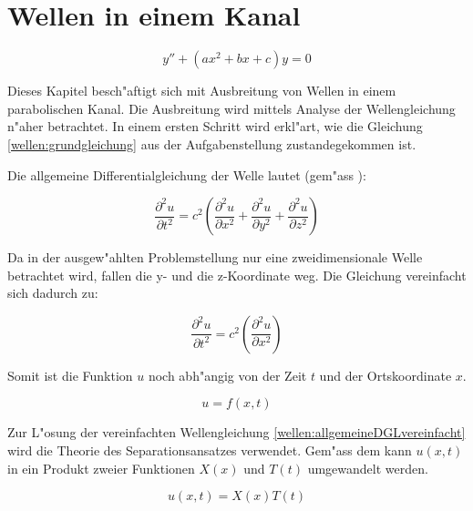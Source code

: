 \chapter{Wellen in einem Kanal\label{chapter:wellen}}
\begin{refsection}

\begin{equation}
	y'' + (ax^2+bx+c)y = 0
	\label{wellen:grundgleichung}
\end{equation}

Dieses Kapitel besch"aftigt sich mit Ausbreitung von Wellen in einem 
parabolischen Kanal. Die Ausbreitung wird mittels Analyse der Wellengleichung 
n"aher betrachtet. In einem ersten Schritt wird erkl"art, wie die 
Gleichung \ref{wellen:grundgleichung} aus der Aufgabenstellung zustandegekommen 
ist.

Die allgemeine Differentialgleichung der Welle lautet (gem"ass 
\cite{wellen:smirnow2}):

\begin{equation*}
	\frac{\partial^2 u}{\partial t^2}
	=
	c^2
	\left(
		\frac{\partial^2 u}{\partial x^2} 
		+ \frac{\partial^2 u}{\partial y^2} 
		+ \frac{\partial^2 u}{\partial z^2}
	\right)
	\label{wellen:allgemeineDGL}
\end{equation*}

Da in der ausgew"ahlten Problemstellung nur eine zweidimensionale Welle 
betrachtet wird, fallen die y- und die z-Koordinate weg. Die Gleichung 
vereinfacht sich dadurch zu:

\begin{equation}
	\frac{\partial^2 u}{\partial t^2}
	=
	c^2
	\left(
		\frac{\partial^2 u}{\partial x^2} 
	\right)
	\label{wellen:allgemeineDGLvereinfacht}
\end{equation}

Somit ist die Funktion $u$ noch abh"angig von der Zeit $t$ und der 
Ortskoordinate 
$x$.

\begin{equation*}
	u = f(x,t)
\end{equation*}

Zur L"osung der vereinfachten Wellengleichung 
\ref{wellen:allgemeineDGLvereinfacht} wird die Theorie des Separationsansatzes 
verwendet. Gem"ass dem kann $u(x, t)$ in ein Produkt zweier Funktionen $X(x)$ 
und $T(t)$ umgewandelt werden.

\begin{equation}
	u (x,t) = X(x) T(t)
	\label{wellen:separierteFunktion}
\end{equation}


\end{refsection}
